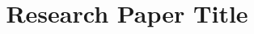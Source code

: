 \documentclass[12pt]{article}
\title{Research Paper Title}
\author{}
\date{}
\begin{document}
\maketitle

\begin{abstract}
\end{abstract}










\end{document}
